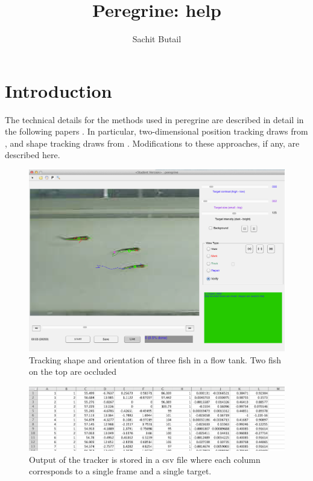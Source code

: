 \documentclass[12pt]{article}
\title{Peregrine: help}
\author{Sachit Butail}
\date{}
\begin{document}
\maketitle
\thispagestyle{empty}
\pagestyle{empty}



\section{Introduction}
The technical details for the methods used in peregrine are described in detail in the following papers \cite{Butail2011,Butail2012b,Butail2012c, Butail2013c}. In particular, two-dimensional position tracking draws from \cite{Butail2013c, Butail2012b}, and shape tracking draws from \cite{Butail2011,Butail2012c}. Modifications to these approaches, if any, are described here.

\begin{figure}[ht]
\centering
\includegraphics[width=.995\linewidth]{screenshot}
\caption{Tracking shape and orientation of three fish in a flow tank. Two fish on the top are occluded}
\label{fig:sample_tracks}
\end{figure}

\begin{figure}[ht]
\centering
\includegraphics[width=.495\linewidth]{output}
\caption{Output of the tracker is stored in a csv file where each column corresponds to a single frame and a single target.}
\label{fig:output}
\end{figure}
\end{document}
